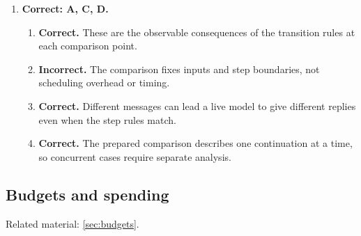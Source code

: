 \begin{enumerate}[start=41,itemsep=0.7\baselineskip]
\item[{\hyperref[exercise:50]{50.}}] \begin{minipage}[t]{\linewidth}
\textbf{Correct: A, C, D.}
\begin{enumerate}[label=\textnormal{(\Alph*)},leftmargin=*,itemsep=0pt]
\item \textbf{Correct.} These are the observable consequences of the transition rules at each comparison point.
\item \textbf{Incorrect.} The comparison fixes inputs and step boundaries, not scheduling overhead or timing.
\item \textbf{Correct.} Different messages can lead a live model to give different replies even when the step rules match.
\item \textbf{Correct.} The prepared comparison describes one continuation at a time, so concurrent cases require separate analysis.
\end{enumerate}
\end{minipage}

\end{enumerate}

\subsection{Budgets and spending}
\noindent Related material: \cref{sec:budgets}.

